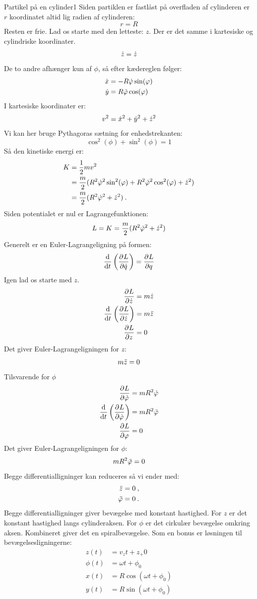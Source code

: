 \begin{opgave}{Partikel på en cylinder}{1}
\opg Siden partiklen er fastlåst på overfladen af cylinderen er $r$ koordinatet altid lig radien af cylinderen:
$$
	r = R
$$
Resten er frie.
\opg Lad os starte med den letteste: $z$. Der er det samme i kartesiske og cylindriske koordinater.
$$
	\dt z = \dt z
$$
De to andre afhænger kun af $\phi$, så efter kædereglen følger:
\begin{align*}
	\dt x &= -R\dt \phi \sin(\phi)\\
	\dt y &= R\dt \phi \cos(\phi)
\end{align*}
\opg I kartesiske koordinater er:
$$
v^2 = \dt x^2+\dt y^2 + \dt z^2
$$
Vi kan her bruge Pythagoras sætning for enhedstrekanten:
$$
	\cos^2(\phi)+\sin^2(\phi) = 1
$$
Så den kinetiske energi er:
\begin{align*}
	K &= \frac{1}{2}mv^2\\
	&= \frac{m}{2}(R^2\dt \phi^2\sin^2(\phi)+R^2\dt  \phi^2\cos^2(\phi)+\dt z^2)\\
	&= \frac{m}{2}(R^2\dt \phi^2+\dt z^2) \: .
\end{align*}
\opg Siden potentialet er nul er Lagrangefunktionen:
$$
	L = K = \frac{m}{2}(R^2\dt \phi^2+\dt z^2)
$$
\opg Generelt er en Euler-Lagrangeligning på formen:
$$
	\el{\dt q} = \pdif{q}{L}
$$
Igen lad os starte med $z$.
\begin{align*}
	\pdif{\dt z}L &= m\dt z\\
	\el{\dt z} &= m\ddt z\\
	\pdif{z}{L} &= 0
\end{align*}
Det giver Euler-Lagrangeligningen for $z$:
$$
	m\ddt z = 0
$$
Tilsvarende for $\phi$
\begin{align*}
	\pdif{\dt \phi}L &= mR^2\dt \phi\\
	\el{\dt \phi} &= mR^2\ddt \phi\\
	\pdif{\phi}{L} &= 0
\end{align*}
Det giver Euler-Lagrangeligningen for $\phi$:
$$
	mR^2\ddt \phi = 0
$$
Begge differentialligninger kan reduceres så vi ender med:
\begin{align*}
	\ddt z &= 0 \: ,\\
	\ddt \phi &= 0 \: .
\end{align*}
\opg Begge differentialligninger giver bevægelse med konstant hastighed. For $z$ er det konstant hastighed langs cylinderaksen. For $\phi$ er det cirkulær bevægelse omkring aksen. Kombineret giver det en spiralbevægelse. Som en bonus er løsningen til bevægelsesligningerne:
\begin{align*}
	z(t) &= v_z t+z_+0 \\
	\phi(t) &= \omega t + \phi_0 \\
	x(t) &= R\cos(\omega t+\phi_0) \\
	y(t) &= R\sin(\omega t + \phi_0)
\end{align*}
\end{opgave}
